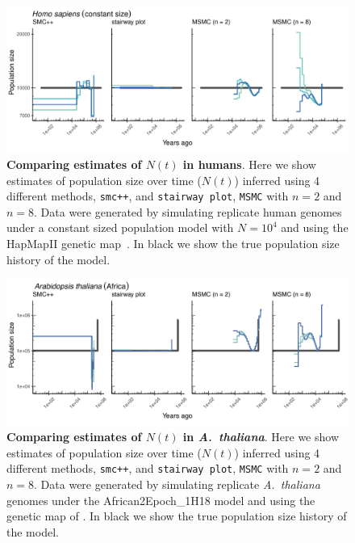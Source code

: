 \documentclass[12pt,halfline,a4paper]{ouparticle}
\newcommand{\MSMC}{\texttt{MSMC}\xspace}
\newcommand{\smcpp}{\texttt{smc++}\xspace}
\begin{document}
\begin{figure}
\begin{center}
\includegraphics[width=0.8\linewidth]{display_items/homo_sapiens_constant.png}
\caption{\textbf{Comparing estimates of $N(t)$ in humans}. Here we show estimates of population
size over time ($N(t)$) inferred using 4 different methods, \smcpp, and \texttt{stairway plot},
\MSMC with $n=2$ and $n=8$. Data were generated by simulating
replicate human genomes under a constant sized population model with $N=10^4$ and using the
HapMapII genetic map~\citep{international2007second}. In black we show the true population size history
of the model.}
\label{fig:n_t_HomSap_constant}
\end{center}
\end{figure}

\begin{figure}
\begin{center}
\includegraphics[width=0.8\linewidth]{display_items/AraTha_African2Epoch_1H18.png}
\caption{\textbf{Comparing estimates of $N(t)$ in \textit{A.~thaliana}}. Here we show estimates of population
size over time ($N(t)$) inferred using 4 different methods, \smcpp, and \texttt{stairway plot},
\MSMC with $n=2$ and $n=8$. Data were generated by simulating
replicate \textit{A.~thaliana} genomes under the African2Epoch\_1H18 model and using
the genetic map of \cite{salome2011recombination}. In black we show the true population size history
of the model.}
\label{fig:n_t_AraTha}
\end{center}
\end{figure}
\end{document}
